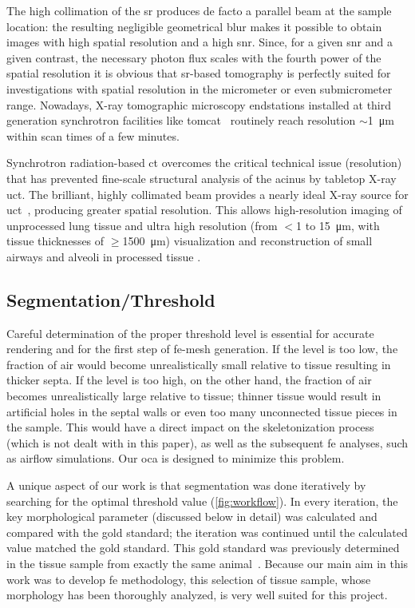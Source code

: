 The high collimation of the \ac{sr} produces de facto a parallel beam at the sample location: the resulting negligible geometrical blur makes it possible to obtain images with high spatial resolution and a high \ac{snr}. Since, for a given \ac{snr} and a given contrast, the necessary photon flux scales with the fourth power of the spatial resolution \cite{Bonse1996} it is obvious that \ac{sr}-based tomography is perfectly suited for investigations with spatial resolution in the micrometer or even submicrometer range. Nowadays, X-ray tomographic microscopy endstations installed at third generation synchrotron facilities like \ac{tomcat}~\cite{Stampanoni2007} routinely reach resolution $\sim$\SI{1}{\micro\meter} within scan times of a few minutes.

Synchrotron radiation-based \ac{ct} overcomes the critical technical issue (resolution) that has prevented fine-scale structural analysis of the acinus by tabletop X-ray \ac{uct}. The brilliant, highly collimated beam provides a nearly ideal X-ray source for \ac{uct}~\cite{Jorgensen1998}, producing greater spatial resolution. This allows high-resolution imaging of unprocessed lung tissue \cite{Bayat2006,Jheon2006,Monfraix2005,Sera2007,Sera2005} and ultra high resolution (from $<$1 to \SI{15}{\micro\meter}, with tissue thicknesses of $\geq$\SI{1500}{\micro\meter}) visualization and \threed reconstruction of small airways and alveoli in processed tissue \cite{Ikura2004,Schittny2008}.

\subsection{Segmentation/Threshold}
Careful determination of the proper threshold level is essential for accurate \threed rendering and for the first step of \ac{fe}-mesh generation. If the level is too low, the fraction of air would become unrealistically small relative to tissue resulting in thicker septa. If the level is too high, on the other hand, the fraction of air becomes unrealistically large relative to tissue; thinner tissue would result in artificial holes in the septal walls or even too many unconnected tissue pieces in the sample. This would have a direct impact on the skeletonization process (which is not dealt with in this paper), as well as the subsequent \ac{fe} analyses, such as airflow simulations. Our \ac{oca} is designed to minimize this problem.

A unique aspect of our work is that segmentation was done iteratively by searching for the optimal threshold value (\autoref{fig:workflow}). In every iteration, the key morphological parameter (discussed below in detail) was calculated and compared with the gold standard; the iteration was continued until the calculated value matched the gold standard. This gold standard was previously determined in the tissue sample from exactly the same animal~\cite{Tschanz2003}. Because our main aim in this work was to develop \ac{fe} methodology, this selection of tissue sample, whose morphology has been thoroughly analyzed, is very well suited for this project.

